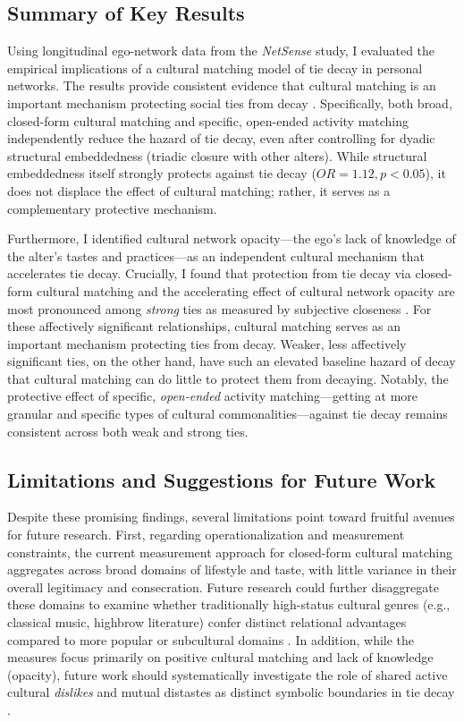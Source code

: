 \documentclass[12pt,letterpaper]{article}
\begin{document}
\subsection{Summary of Key Results}\label{summary-of-key-results}
Using longitudinal ego-network data from the \textit{NetSense} study, I evaluated the empirical implications of a cultural matching model of tie decay in personal networks. The results provide consistent evidence that cultural matching is an important mechanism protecting social ties from decay \citep{burt2000}. Specifically, both broad, closed-form cultural matching and specific, open-ended activity matching independently reduce the hazard of tie decay, even after controlling for dyadic structural embeddedness (triadic closure with other alters). While structural embeddedness itself strongly protects against tie decay ($OR = 1.12, p < 0.05$), it does not displace the effect of cultural matching; rather, it serves as a complementary protective mechanism. 

Furthermore, I identified cultural network opacity---the ego's lack of knowledge of the alter's tastes and practices---as an independent cultural mechanism that accelerates tie decay. Crucially, I found that protection from tie decay via closed-form cultural matching and the accelerating effect of cultural network opacity are most pronounced among \textit{strong} ties as measured by subjective closeness \citep{marsden1984measuring-f62}. For these affectively significant relationships, cultural matching serves as an important mechanism protecting ties from decay. Weaker, less affectively significant ties, on the other hand, have such an elevated baseline hazard of decay that cultural matching can do little to protect them from decaying. Notably, the protective effect of specific, \textit{open-ended} activity matching---getting at more granular and specific types of cultural commonalities---against tie decay remains consistent across both weak and strong ties.

\subsection{Limitations and Suggestions for Future Work}\label{limitations-and-future-work}
Despite these promising findings, several limitations point toward fruitful avenues for future research. First, regarding operationalization and measurement constraints, the current measurement approach for closed-form cultural matching aggregates across broad domains of lifestyle and taste, with little variance in their overall legitimacy and consecration. Future research could further disaggregate these domains to examine whether traditionally high-status cultural genres (e.g., classical music, highbrow literature) confer distinct relational advantages compared to more popular or subcultural domains \citep{dimaggio1987, lizardo2006, meuleman2023cultural-eab}. In addition, while the measures focus primarily on positive cultural matching and lack of knowledge (opacity), future work should systematically investigate the role of shared active cultural \textit{dislikes} and mutual distastes as distinct symbolic boundaries in tie decay \citep{edelmann2014cultural-a77}.
\end{document}
